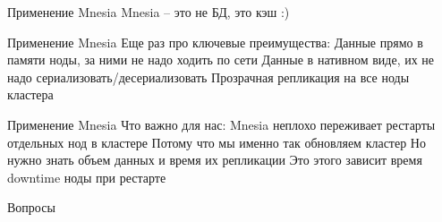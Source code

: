 \documentclass{beamer}
\begin{document}
\begin{frame}
 Применение Mnesia
Mnesia -- это не БД, это кэш :)
\end{frame}

\begin{frame}
 Применение Mnesia
Еще раз про ключевые преимущества:
Данные прямо в памяти ноды, за ними не надо ходить по сети
Данные в нативном виде, их не надо сериализовать/десериализовать
Прозрачная репликация на все ноды кластера
\end{frame}

\begin{frame}
 Применение Mnesia
Что важно для нас:
Mnesia неплохо переживает рестарты отдельных нод в кластере
Потому что мы именно так обновляем кластер
Но нужно знать объем данных и время их репликации
Это этого зависит время downtime ноды при рестарте
\end{frame}

\begin{frame}
 Вопросы
\end{frame}
\end{document}
